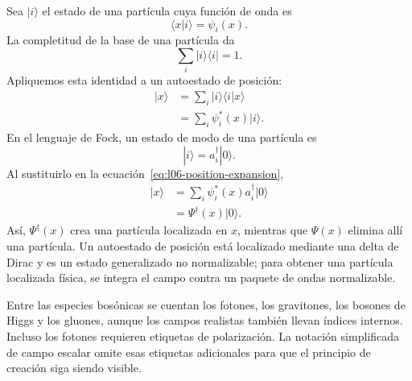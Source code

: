 Sea \(|i\rangle\) el estado de una partícula cuya función de onda es
\begin{equation}
\langle x|i\rangle=\psi_i(x).
\end{equation}
La completitud de la base de una partícula da
\begin{equation}
\sum_i|i\rangle\langle i|=1.
\label{eq:l06-completeness}
\end{equation}
Apliquemos esta identidad a un autoestado de posición:
\begin{align}
|x\rangle
&=\sum_i|i\rangle\langle i|x\rangle \\
&=\sum_i\psi_i^*(x)|i\rangle.
\label{eq:l06-position-expansion}
\end{align}
En el lenguaje de Fock, un estado de modo de una partícula es
\begin{equation}
|i\rangle=a_i^\dagger|0\rangle.
\end{equation}
Al sustituirlo en la ecuación~\eqref{eq:l06-position-expansion},
\begin{align}
|x\rangle
&=\sum_i\psi_i^*(x)a_i^\dagger|0\rangle \\
&=\Psi^\dagger(x)|0\rangle.
\label{eq:l06-local-creation}
\end{align}
Así, \(\Psi^\dagger(x)\) crea una partícula localizada en \(x\), mientras que \(\Psi(x)\) elimina allí una partícula. Un autoestado de posición está localizado mediante una delta de Dirac y es un estado generalizado no normalizable; para obtener una partícula localizada física, se integra el campo contra un paquete de ondas normalizable.

\begin{classroomqa}
\end{classroomqa}

Entre las especies bosónicas se cuentan los fotones, los gravitones, los bosones de Higgs y los gluones, aunque los campos realistas también llevan índices internos. Incluso los fotones requieren etiquetas de polarización. La notación simplificada de campo escalar omite esas etiquetas adicionales para que el principio de creación siga siendo visible.

